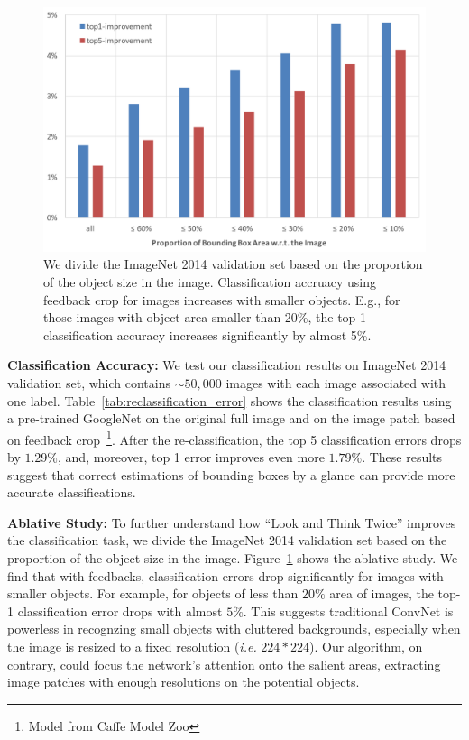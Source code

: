 \setlength{\tabcolsep}{2pt}
\begin{figure}[htb]
\begin{center}
\includegraphics[width=\columnwidth]{figs/re-classification/delta.pdf}
\caption{We divide the ImageNet 2014 validation set based on the proportion of the object size in the image. Classification accruacy using feedback crop for images increases with smaller objects. E.g., for those images with object area smaller than 20\%, the top-1 classification accuracy increases significantly by almost 5\%.}
\label{fig:reclassification_delta}
\end{center}
\end{figure}

\textbf{Classification Accuracy:} We test our classification results on ImageNet 2014 validation set, which contains $\sim50,000$ images with each image associated with one label. Table~\ref{tab:reclassification_error} shows the classification results using a pre-trained GoogleNet on the original full image and on the image patch based on feedback crop~\footnote{Model from Caffe Model Zoo}. After the re-classification, the top 5 classification errors drops by $1.29\%$, and, moreover, top 1 error improves even more $1.79\%$. These results suggest that correct estimations of bounding boxes by a glance can provide more accurate classifications.

\textbf{Ablative Study:} To further understand how ``Look and Think Twice'' improves the classification task, we divide the ImageNet 2014 validation set based on the proportion of the object size in the image. Figure~\ref{fig:reclassification_delta} shows the ablative study. We find that with feedbacks, classification errors drop significantly for images with smaller objects. For example, for objects of less than $20\%$ area of images, the top-1 classification error drops with almost
$5\%$. This suggests traditional ConvNet is powerless in recognzing small objects with cluttered backgrounds, especially when the image is resized to a fixed resolution ({\em i.e.} $224*224$). Our algorithm, on contrary, could focus the network's attention onto the salient areas, extracting image patches with enough resolutions on the potential objects.

